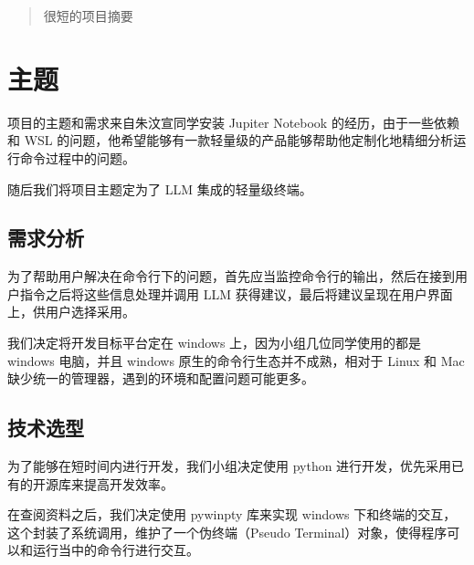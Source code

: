 \documentclass{article}
\theoremstyle{plain}
\theoremstyle{definition}
\theoremstyle{remark}
\begin{document}

\begin{abstract}
很短的项目摘要
\end{abstract}

\section{主题}

项目的主题和需求来自朱汶宣同学安装 Jupiter Notebook 的经历，由于一些依赖和 WSL 的问题，他希望能够有一款轻量级的产品能够帮助他定制化地精细分析运行命令过程中的问题。

随后我们将项目主题定为了 LLM 集成的轻量级终端。

\subsection{需求分析}

为了帮助用户解决在命令行下的问题，首先应当监控命令行的输出，然后在接到用户指令之后将这些信息处理并调用 LLM 获得建议，最后将建议呈现在用户界面上，供用户选择采用。

我们决定将开发目标平台定在 windows 上，因为小组几位同学使用的都是 windows 电脑，并且 windows 原生的命令行生态并不成熟，相对于 Linux 和 Mac 缺少统一的管理器，遇到的环境和配置问题可能更多。

\subsection{技术选型}

为了能够在短时间内进行开发，我们小组决定使用 python 进行开发，优先采用已有的开源库来提高开发效率。

在查阅资料之后，我们决定使用 pywinpty 库来实现 windows 下和终端的交互，这个封装了系统调用，维护了一个伪终端（Pseudo Terminal）对象，使得程序可以和运行当中的命令行进行交互。
\end{document}
